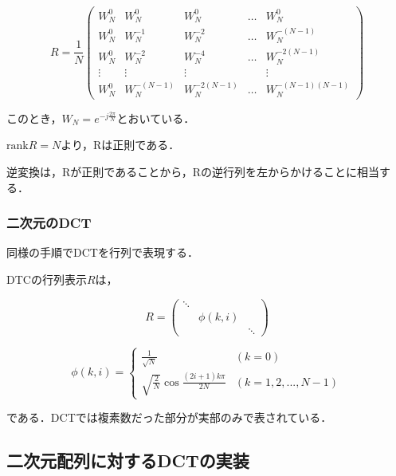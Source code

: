 \documentclass[uplatex,dvipdfmx,ja=standard]{bxjsarticle}
\begin{document}
\begin{equation}
    R = \frac{1}{N}
    \label{exp:mat_dft}
        \begin{pmatrix}   
            W_N^0  & W_N^0        & W_N^0         & \ldots  &  W_N^0     \\
            W_N^0  & W_N^{-1}     & W_N^{-2}      & \ldots  & W_N^{-(N-1)}  \\
            W_N^0  & W_N^{-2}     & W_N^{-4}      & \ldots  & W_N^{-2(N-1)}  \\
            \vdots & \vdots       & \vdots        &         & \vdots \\
            W_N^0  & W_N^{-(N-1)} & W_N^{-2(N-1)} & \ldots  & W_N^{-(N-1)(N-1)}
    \end{pmatrix}
\end{equation}

このとき，$W_N = e^{-j\frac{2\pi}{N}}$とおいている．

$\mathrm{rank}R = N$より，Rは正則である．

逆変換は，Rが正則であることから，Rの逆行列を左からかけることに相当する．

\subsubsection{二次元のDCT}

同様の手順でDCTを行列で表現する．

DTCの行列表示$R$は，

\begin{equation}
    R =
    \label{exp:base}
        \begin{pmatrix}   
\ddots &           &        \\
       & \phi(k,i) &        \\
       &           & \ddots         
        \end{pmatrix}
\end{equation}

\begin{displaymath}
\phi(k,i)=
\left\{
\begin{array}{ll}
    \frac{1}{\sqrt{N}} & (k=0) \\
    \sqrt{\frac{2}{N}} \cos \frac{(2i+1)k\pi}{2N} & (k = 1,2,...,N-1)
\end{array}
\right.
\end{displaymath}

である．DCTでは複素数だった部分が実部のみで表されている．

\subsection{二次元配列に対するDCTの実装}
\end{document}
